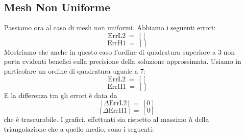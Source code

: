 \documentclass[12pt,a4paper]{report}
\theoremstyle{theorem}
\theoremstyle{theorem}
\theoremstyle{definition}
\providecommand{\abs}[1]{\lvert \, #1 \, \rvert}
\begin{document}
\subsection{Mesh Non Uniforme}
Passiamo ora al caso di mesh non uniformi. Abbiamo i seguenti errori:
\[ \text{ErrL2} \ = \ [] \]
\[ \text{ErrH1} \ = \ [] \]
Mostriamo che anche in questo caso l'ordine di quadratura superiore a $3$ non porta evidenti benefici sulla precisione della soluzione approssimata. Usiamo in particolare un ordine di quadratura uguale a $7$:
\[ \text{ErrL2} \ = \ [] \]
\[ \text{ErrH1} \ = \ [] \]
E la differenza tra gli errori è data da
\[ \abs{ \Delta \text{ErrL2}} \ = \ [0] \]
\[ \abs{ \Delta \text{ErrH1}} \ = \ [0] \]
che è trascurabile. I grafici, effettuati sia rispetto al massimo $h$ della triangolazione che a quello medio, sono i seguenti:
\end{document}
